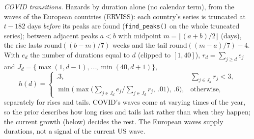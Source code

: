 \documentclass[11pt,a4paper]{article}
\theoremstyle{definition}
\theoremstyle{remark}
\begin{document}
\emph{COVID transitions.} Hazards by duration alone (no calendar term),
from the waves of the European countries (ERVISS): each country's series
is truncated at $t-182$ days \emph{before} its peaks are found
(\texttt{find\_peaks()} on the whole truncated series); between adjacent
peaks $a<b$ with midpoint $m=\lfloor(a+b)/2\rfloor$ (days), the rise lasts
$\mathrm{round}((b-m)/7)$ weeks and the tail $\mathrm{round}((m-a)/7)-4$.
With $e_d$ the number of durations equal to $d$ (clipped to $[1,40]$),
$r_d=\sum_{j\ge d}e_j$ and $J_d=\{\max(1,d-1),\dots,\min(40,d+1)\}$,
\[
 h(d)=\begin{cases}
 .3,&\sum_{j\in J_d}r_j<3,\\
 \min\bigl(\max\bigl(\sum_{j\in J_d}e_j/\sum_{j\in J_d}r_j,\ .01\bigr),\ .6\bigr),
 &\text{otherwise},
 \end{cases}
\]
separately for rises and tails. COVID's waves come at varying times of the
year, so the prior describes how long rises and tails last rather than
when they happen; the current growth (below) decides the rest. The
European waves supply durations, not a signal of the current US wave.
\end{document}

